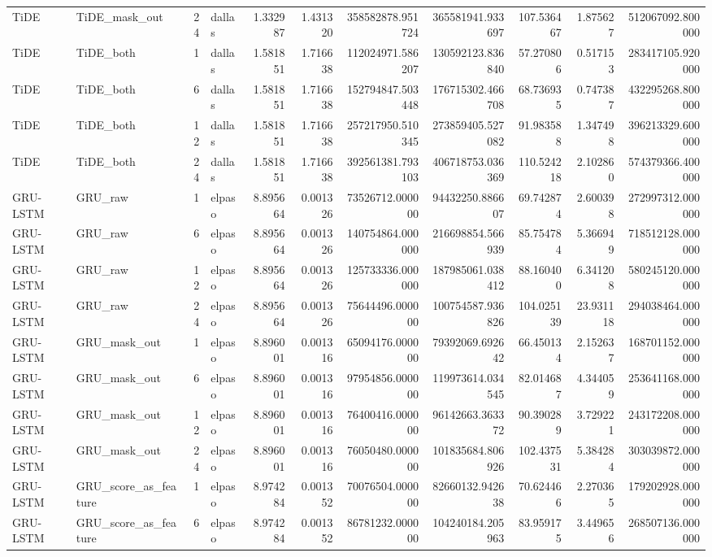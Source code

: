 \begin{longtable}{llrlrrrrrrr}
TiDE & TiDE\_mask\_out & 24 & dallas & 1.332987 & 1.431320 & 358582878.951724 & 365581941.933697 & 107.536467 & 1.875627 & 512067092.800000 \\
TiDE & TiDE\_both & 1 & dallas & 1.581851 & 1.716638 & 112024971.586207 & 130592123.836840 & 57.270806 & 0.517153 & 283417105.920000 \\
TiDE & TiDE\_both & 6 & dallas & 1.581851 & 1.716638 & 152794847.503448 & 176715302.466708 & 68.736935 & 0.747387 & 432295268.800000 \\
TiDE & TiDE\_both & 12 & dallas & 1.581851 & 1.716638 & 257217950.510345 & 273859405.527082 & 91.983588 & 1.347498 & 396213329.600000 \\
TiDE & TiDE\_both & 24 & dallas & 1.581851 & 1.716638 & 392561381.793103 & 406718753.036369 & 110.524218 & 2.102860 & 574379366.400000 \\
GRU-LSTM & GRU\_raw & 1 & elpaso & 8.895664 & 0.001326 & 73526712.000000 & 94432250.886607 & 69.742874 & 2.600398 & 272997312.000000 \\
GRU-LSTM & GRU\_raw & 6 & elpaso & 8.895664 & 0.001326 & 140754864.000000 & 216698854.566939 & 85.754784 & 5.366949 & 718512128.000000 \\
GRU-LSTM & GRU\_raw & 12 & elpaso & 8.895664 & 0.001326 & 125733336.000000 & 187985061.038412 & 88.160400 & 6.341208 & 580245120.000000 \\
GRU-LSTM & GRU\_raw & 24 & elpaso & 8.895664 & 0.001326 & 75644496.000000 & 100754587.936826 & 104.025139 & 23.931118 & 294038464.000000 \\
GRU-LSTM & GRU\_mask\_out & 1 & elpaso & 8.896001 & 0.001316 & 65094176.000000 & 79392069.692642 & 66.450134 & 2.152637 & 168701152.000000 \\
GRU-LSTM & GRU\_mask\_out & 6 & elpaso & 8.896001 & 0.001316 & 97954856.000000 & 119973614.034545 & 82.014687 & 4.344059 & 253641168.000000 \\
GRU-LSTM & GRU\_mask\_out & 12 & elpaso & 8.896001 & 0.001316 & 76400416.000000 & 96142663.363372 & 90.390289 & 3.729221 & 243172208.000000 \\
GRU-LSTM & GRU\_mask\_out & 24 & elpaso & 8.896001 & 0.001316 & 76050480.000000 & 101835684.806926 & 102.437531 & 5.384284 & 303039872.000000 \\
GRU-LSTM & GRU\_score\_as\_feature & 1 & elpaso & 8.974284 & 0.001352 & 70076504.000000 & 82660132.942638 & 70.624466 & 2.270365 & 179202928.000000 \\
GRU-LSTM & GRU\_score\_as\_feature & 6 & elpaso & 8.974284 & 0.001352 & 86781232.000000 & 104240184.205963 & 83.959175 & 3.449656 & 268507136.000000 \\

\end{longtable}
